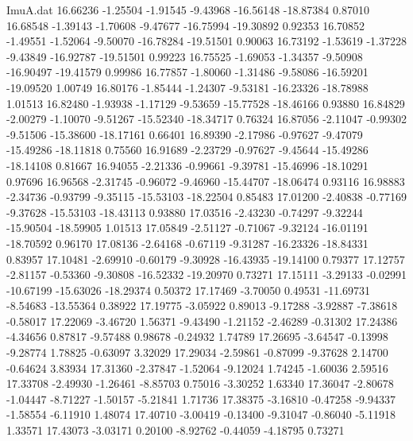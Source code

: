 \begin{filecontents}{ImuA.dat}
  16.66236   -1.25504   -1.91545   -9.43968  -16.56148  -18.87384    0.87010
  16.68548   -1.39143   -1.70608   -9.47677  -16.75994  -19.30892    0.92353
  16.70852   -1.49551   -1.52064   -9.50070  -16.78284  -19.51501    0.90063
  16.73192   -1.53619   -1.37228   -9.43849  -16.92787  -19.51501    0.99223
  16.75525   -1.69053   -1.34357   -9.50908  -16.90497  -19.41579    0.99986
  16.77857   -1.80060   -1.31486   -9.58086  -16.59201  -19.09520    1.00749
  16.80176   -1.85444   -1.24307   -9.53181  -16.23326  -18.78988    1.01513
  16.82480   -1.93938   -1.17129   -9.53659  -15.77528  -18.46166    0.93880
  16.84829   -2.00279   -1.10070   -9.51267  -15.52340  -18.34717    0.76324
  16.87056   -2.11047   -0.99302   -9.51506  -15.38600  -18.17161    0.66401
  16.89390   -2.17986   -0.97627   -9.47079  -15.49286  -18.11818    0.75560
  16.91689   -2.23729   -0.97627   -9.45644  -15.49286  -18.14108    0.81667
  16.94055   -2.21336   -0.99661   -9.39781  -15.46996  -18.10291    0.97696
  16.96568   -2.31745   -0.96072   -9.46960  -15.44707  -18.06474    0.93116
  16.98883   -2.34736   -0.93799   -9.35115  -15.53103  -18.22504    0.85483
  17.01200   -2.40838   -0.77169   -9.37628  -15.53103  -18.43113    0.93880
  17.03516   -2.43230   -0.74297   -9.32244  -15.90504  -18.59905    1.01513
  17.05849   -2.51127   -0.71067   -9.32124  -16.01191  -18.70592    0.96170
  17.08136   -2.64168   -0.67119   -9.31287  -16.23326  -18.84331    0.83957
  17.10481   -2.69910   -0.60179   -9.30928  -16.43935  -19.14100    0.79377
  17.12757   -2.81157   -0.53360   -9.30808  -16.52332  -19.20970    0.73271
  17.15111   -3.29133   -0.02991  -10.67199  -15.63026  -18.29374    0.50372
  17.17469   -3.70050    0.49531  -11.69731   -8.54683  -13.55364    0.38922
  17.19775   -3.05922    0.89013   -9.17288   -3.92887   -7.38618   -0.58017
  17.22069   -3.46720    1.56371   -9.43490   -1.21152   -2.46289   -0.31302
  17.24386   -4.34656    0.87817   -9.57488    0.98678   -0.24932    1.74789
  17.26695   -3.64547   -0.13998   -9.28774    1.78825   -0.63097    3.32029
  17.29034   -2.59861   -0.87099   -9.37628    2.14700   -0.64624    3.83934
  17.31360   -2.37847   -1.52064   -9.12024    1.74245   -1.60036    2.59516
  17.33708   -2.49930   -1.26461   -8.85703    0.75016   -3.30252    1.63340
  17.36047   -2.80678   -1.04447   -8.71227   -1.50157   -5.21841    1.71736
  17.38375   -3.16810   -0.47258   -9.94337   -1.58554   -6.11910    1.48074
  17.40710   -3.00419   -0.13400   -9.31047   -0.86040   -5.11918    1.33571
  17.43073   -3.03171    0.20100   -8.92762   -0.44059   -4.18795    0.73271

\end{filecontents}
